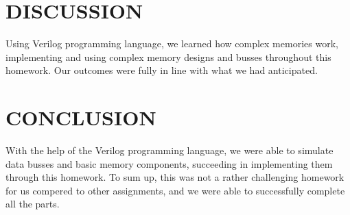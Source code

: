 \documentclass[pdftex,12pt,a4paper]{article}
\theoremstyle{plain}
\begin{document}
\section{DISCUSSION}
Using Verilog programming language, we learned how complex memories work, implementing and using complex memory designs and busses throughout this homework. Our outcomes were fully in line with what we had anticipated.

\section{CONCLUSION}
With the help of the Verilog programming language, we were able to simulate data busses and basic memory components, succeeding in implementing them through this homework. To sum up, this was not a rather challenging homework for us compered to other assignments, and we were able to successfully complete all the parts.
\end{document}
